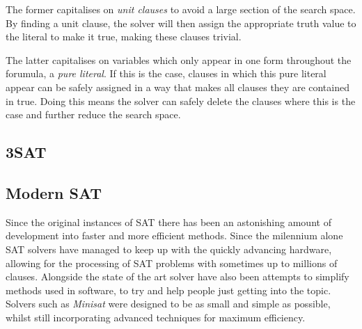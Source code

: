 \documentclass{article}
\begin{document}
The former capitalises on \textit{unit clauses} to avoid a large section of the search space. By finding a unit clause, the solver will then assign the appropriate truth value to the literal to make it true, making these clauses trivial.

The latter capitalises on variables which only appear in one form throughout the forumula, a \textit{pure literal}. If this is the case, clauses in which this pure literal appear can be safely assigned in a way that makes all clauses they are contained in true. Doing this means the solver can safely delete the clauses where this is the case and further reduce the search space.

\subsection{3SAT}

\subsection{Modern SAT}
Since the original instances of SAT there has been an astonishing amount of development into
faster and more efficient methods. Since the milennium alone SAT solvers have managed to keep up
with the quickly advancing hardware, allowing for the processing of SAT problems with sometimes up
to millions of clauses. Alongside the state of the art solver have also been attempts to simplify
methods used in software, to try and help people just getting into the topic. Solvers such as
\textit{Minisat} were designed to be as small and simple as possible, whilst still incorporating
advanced techniques for maximum efficiency. 
\end{document}
